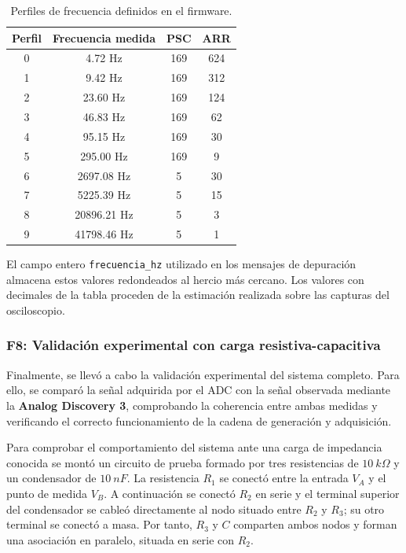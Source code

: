 \documentclass[11pt,a4paper]{article}
\begin{document}
\begin{table}[H]
\centering
\begin{tabular}{c c c c}
\toprule
Perfil & Frecuencia medida & PSC & ARR \\
\midrule
0 & 4.72 Hz & 169 & 624 \\
1 & 9.42 Hz & 169 & 312 \\
2 & 23.60 Hz & 169 & 124 \\
3 & 46.83 Hz & 169 & 62 \\
4 & 95.15 Hz & 169 & 30 \\
5 & 295.00 Hz & 169 & 9 \\
6 & 2697.08 Hz & 5 & 30 \\
7 & 5225.39 Hz & 5 & 15 \\
8 & 20896.21 Hz & 5 & 3 \\
9 & 41798.46 Hz & 5 & 1 \\
\bottomrule
\end{tabular}
\caption{Perfiles de frecuencia definidos en el firmware.}
\label{tab:perfiles-frecuencia}
\end{table}

El campo entero \texttt{frecuencia\_hz} utilizado en los mensajes de depuración almacena estos valores redondeados al hercio más cercano. Los valores con decimales de la tabla proceden de la estimación realizada sobre las capturas del osciloscopio.

\subsubsection{F8: Validación experimental con carga resistiva-capacitiva}

Finalmente, se llevó a cabo la validación experimental del sistema completo. Para ello, se comparó la señal adquirida por el ADC con la señal observada mediante la \textbf{Analog Discovery 3}, comprobando la coherencia entre ambas medidas y verificando el correcto funcionamiento de la cadena de generación y adquisición.

Para comprobar el comportamiento del sistema ante una carga de impedancia conocida se montó un circuito de prueba formado por tres resistencias de \(10~k\Omega\) y un condensador de \(10~nF\). La resistencia \(R_1\) se conectó entre la entrada \(V_A\) y el punto de medida \(V_B\). A continuación se conectó \(R_2\) en serie y el terminal superior del condensador se cableó directamente al nodo situado entre \(R_2\) y \(R_3\); su otro terminal se conectó a masa. Por tanto, \(R_3\) y \(C\) comparten ambos nodos y forman una asociación en paralelo, situada en serie con \(R_2\).
\end{document}
